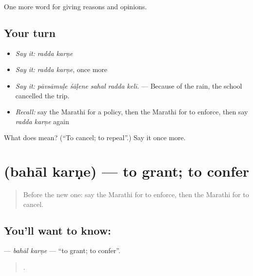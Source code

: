 \begin{grammarlens}[title={What you've built}]
One more word for giving reasons and opinions.
\end{grammarlens}

\subsection*{Your turn}
\begin{itemize}
\raggedright
  \item \emph{Say it:} \emph{radda karṇe}
  \item \emph{Say it:} \emph{radda karṇe}, once more
  \item \emph{Say it:} \emph{pāvsāmuḷe śāḷene sahal radda kelī.} — Because of the rain, the school cancelled the trip.
  \item \emph{Recall:} say the Marathi for a policy, then the Marathi for to enforce, then say \emph{radda karṇe} again
\end{itemize}

\begin{tcolorbox}[breakable,colback=teal!4,colframe=teal!35!black,title={Before you move on}]
What does   mean? (\textquotedblleft{}To cancel; to repeal\textquotedblright{}.) Say it once more.
\end{tcolorbox}
\section[\texorpdfstring{\mr{बहाल} \mr{करणे} (bahāl karṇe)}{बहाल करणे (bahāl karṇe)}]{  (bahāl karṇe) — to grant; to confer}

\label{lesson:MR-C358-bahal-karne}



\begin{quote}
Before the new one: say the Marathi for to enforce, then the Marathi for to cancel.
\end{quote}

\subsection*{You'll want to know:  }
\textbf{ } — \emph{bahāl karṇe} — \textquotedblleft{}to grant; to confer\textquotedblright{}.

\begin{quote}
     .
\end{quote}

